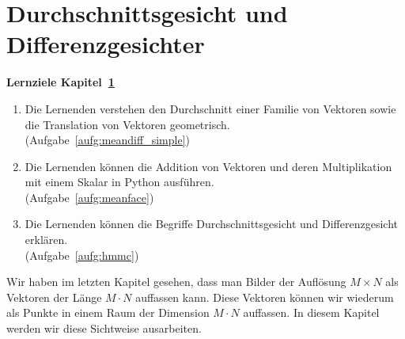\section{Durchschnittsgesicht und Differenzgesichter} \label{sec:facespace}
\begin{tcolorbox}
	\centerline{\textbf{Lernziele Kapitel~\ref{sec:facespace}}}
	\begin{enumerate}[leftmargin=*,label=\thesection.\arabic*]
		\item \label{item:meandiff_simple} Die Lernenden verstehen den Durchschnitt einer Familie von Vektoren sowie die Translation von Vektoren geometrisch.\\
		(Aufgabe~\ref{aufg:meandiff_simple})
		\item \label{item:meanface} Die Lernenden können die Addition von Vektoren und deren Multiplikation mit einem Skalar in Python ausführen.\\
		(Aufgabe~\ref{aufg:meanface})
		\item \label{item:hmmc} Die Lernenden können die Begriffe Durchschnittsgesicht und Differenzgesicht erklären.\\
		(Aufgabe~\ref{aufg:hmmc})
	\end{enumerate}
\end{tcolorbox}
Wir haben im letzten Kapitel gesehen, dass man Bilder der Auflösung $M\times N$ als Vektoren der Länge $M\cdot N$ auffassen kann.
Diese Vektoren können wir wiederum als Punkte in einem Raum der Dimension $M\cdot N$ auffassen.
In diesem Kapitel werden wir diese Sichtweise ausarbeiten.

